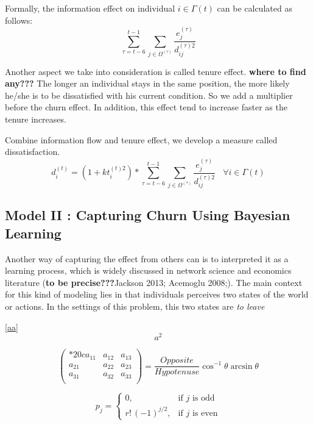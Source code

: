 \documentclass[tcn = 37075, sheet = true, abstract = true]{mcmthesis}
\begin{document}
Formally, the information effect on individual $i\in \Gamma{(t)}$ can be calculated as follows:
$$\sum_{\tau=t-6}^{t-1}\sum_{j\in \Omega^{(\tau)}}\frac{e_j^{(\tau)}}{d_{ij}^{(\tau)2}}$$

Another aspect we take into consideration is called tenure effect. \textbf{where to find any???} The longer an individual stays in the same position, the more likely he/she is to be dissatisfied with his current condition. So we add a multiplier before the churn effect. In addition, this effect tend to increase faster as the tenure increases. 

Combine information flow and tenure effect, we develop a measure called dissatisfaction. 
$$\displaystyle d_i^{(t)}=(1+kt_i^{(t)2})*\sum_{\tau=t-6}^{t-1}\sum_{j\in \Omega^{(\tau)}}\frac{e_j^{(\tau)}}{d_{ij}^{(\tau)2}}~~~~\forall i\in \Gamma{(t)}
$$


\subsection{Model II : Capturing Churn Using Bayesian Learning}

Another way of capturing the effect from others can is to interpreted it as a learning process, which is widely discussed in network science and economics literature (\textbf{to be precise???}Jackson 2013; Acemoglu 2008;). The main context for this kind of modeling lies in that individuals perceives two states of the world or actions. In the settings of this problem, this two states are \textit{to leave}

\lipsum[8] \eqref{aa}
\begin{equation}
a^2 \label{aa}
\end{equation}

\[
  \begin{pmatrix}{*{20}c}
  {a_{11} } & {a_{12} } & {a_{13} }  \\
  {a_{21} } & {a_{22} } & {a_{23} }  \\
  {a_{31} } & {a_{32} } & {a_{33} }  \\
  \end{pmatrix}
  = \frac{{Opposite}}{{Hypotenuse}}\cos ^{ - 1} \theta \arcsin \theta
\]
\lipsum[9]

\[
  p_{j}=\begin{cases} 0,&\text{if $j$ is odd}\\
  r!\,(-1)^{j/2},&\text{if $j$ is even}
  \end{cases}
\]

\lipsum[10]
\end{document}
